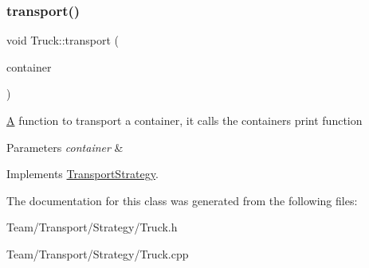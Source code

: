 \subsubsection{\texorpdfstring{transport()}{transport()}}
{\footnotesize\ttfamily void Truck\+::transport (\begin{DoxyParamCaption}\item[{\hyperlink{classContainer}{Container} $\ast$}]{container }\end{DoxyParamCaption})\hspace{0.3cm}{\ttfamily [virtual]}}

\hyperlink{classA}{A} function to transport a container, it calls the containers print function 
\begin{DoxyParams}{Parameters}
{\em container} & \\
\hline
\end{DoxyParams}


Implements \hyperlink{classTransportStrategy_ab5659f9d5d352ba0a23f1e99edd3d488}{Transport\+Strategy}.



The documentation for this class was generated from the following files\+:\begin{DoxyCompactItemize}
\item 
Team/\+Transport/\+Strategy/Truck.\+h\item 
Team/\+Transport/\+Strategy/Truck.\+cpp\end{DoxyCompactItemize}
